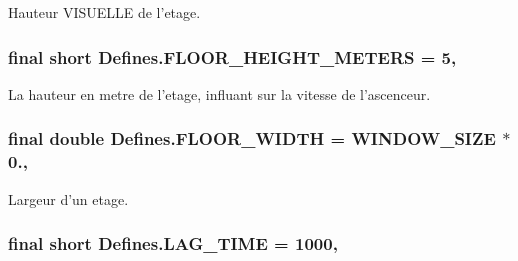 Hauteur V\-I\-S\-U\-E\-L\-L\-E de l'etage. 

\hypertarget{classDefines_aae6f35fc0dc85e4189f0be67c6af6fb1}{
\subsubsection[{F\-L\-O\-O\-R\-\_\-\-H\-E\-I\-G\-H\-T\-\_\-\-M\-E\-T\-E\-R\-S}]{\setlength{\rightskip}{0pt plus 5cm}final short Defines.\-F\-L\-O\-O\-R\-\_\-\-H\-E\-I\-G\-H\-T\-\_\-\-M\-E\-T\-E\-R\-S = 5\hspace{0.3cm}{\ttfamily [static]}, {\ttfamily [package]}}}\label{classDefines_aae6f35fc0dc85e4189f0be67c6af6fb1}


La hauteur en metre de l'etage, influant sur la vitesse de l'ascenceur. 

\hypertarget{classDefines_ad5528ce6b91911a4ca4e9f364543ef9c}{
\subsubsection[{F\-L\-O\-O\-R\-\_\-\-W\-I\-D\-T\-H}]{\setlength{\rightskip}{0pt plus 5cm}final double Defines.\-F\-L\-O\-O\-R\-\_\-\-W\-I\-D\-T\-H = {\bf W\-I\-N\-D\-O\-W\-\_\-\-S\-I\-Z\-E} $\ast$ 0.\hspace{0.3cm}{\ttfamily [static]}, {\ttfamily [package]}}}\label{classDefines_ad5528ce6b91911a4ca4e9f364543ef9c}


Largeur d'un etage. 

\hypertarget{classDefines_a496860d61bb30a925275bfde3ddc3b20}{
\subsubsection[{L\-A\-G\-\_\-\-T\-I\-M\-E}]{\setlength{\rightskip}{0pt plus 5cm}final short Defines.\-L\-A\-G\-\_\-\-T\-I\-M\-E = 1000\hspace{0.3cm}{\ttfamily [static]}, {\ttfamily [package]}}}\label{classDefines_a496860d61bb30a925275bfde3ddc3b20}


